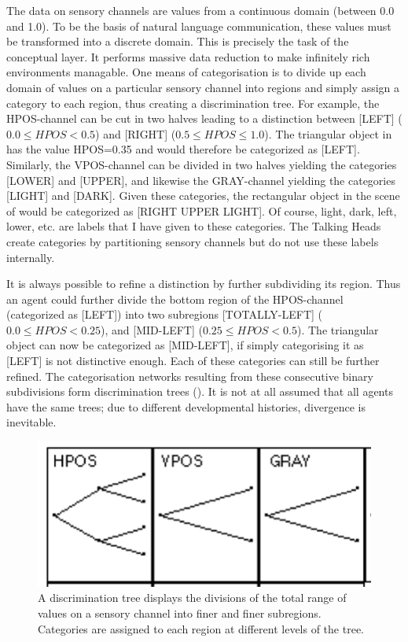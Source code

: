 The data on sensory channels are values from a continuous domain
(between 0.0 and 1.0). 
To be the basis of natural language communication, these
values must be transformed into a discrete domain. This is 
precisely the task of the conceptual layer. It 
performs massive data reduction to make infinitely
rich environments managable. One means of categorisation
is to divide up each domain of values on a particular
sensory channel into regions and 
simply assign a category to each region, thus creating a 
discrimination tree. For example, 
the HPOS-channel can be cut in two halves leading to a 
distinction between [LEFT] ($0.0 \leq HPOS < 0.5$) and [RIGHT] 
($0.5 \leq HPOS \leq 1.0$). The triangular object 
in  has the value HPOS=0.35 
and would therefore be categorized as [LEFT]. Similarly, the 
VPOS-channel can be divided in two halves yielding the 
categories [LOWER] and [UPPER], and likewise the GRAY-channel
yielding the categories [LIGHT] and [DARK]. 
Given these categories, 
the rectangular object in the scene of 
 would be categorized as [RIGHT UPPER LIGHT].
Of course, light, dark, left, lower, etc. are labels 
that I have given to these categories. The Talking Heads 
create categories by partitioning sensory channels but do
not use these labels internally. 

It is always possible to refine a distinction by further
subdividing its region. Thus an agent could further divide the 
bottom region of the HPOS-channel (categorized as 
[LEFT]) into two subregions [TOTALLY-LEFT] ($0.0 \le HPOS < 0.25$), 
and [MID-LEFT] ($0.25 \le HPOS < 0.5$). The triangular object
can now be categorized as [MID-LEFT], if simply categorising it
as [LEFT] is not distinctive enough. Each of these categories can 
still be further refined. The categorisation networks
resulting from these consecutive binary subdivisions form
discrimination trees (). It is not at
all assumed that all agents have the same trees; due to 
different developmental histories, divergence is inevitable. 

\begin{figure}[htbp]
  \centerline{\includegraphics[width=.35\textwidth]{chap2/figs/tree1}}
\caption{\label{tree1} A discrimination tree displays
the divisions of the total range of 
values on a sensory channel into finer and finer subregions. 
Categories are assigned to each region at different 
levels of the tree.}
\end{figure}

